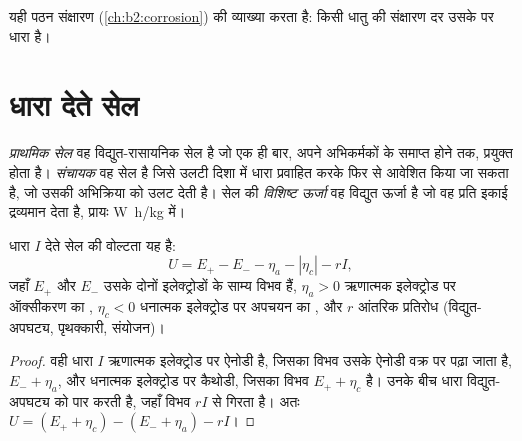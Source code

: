 यही पठन संक्षारण (\cref{ch:b2:corrosion}) की व्याख्या करता है: किसी धातु की संक्षारण
दर उसके  पर धारा है।

\section{धारा देते सेल}

\begin{definition}[बैटरियाँ]\label{def:b2:batteries-electrolysis:battery}
\emph{प्राथमिक सेल} वह विद्युत-रासायनिक सेल है जो
एक ही बार, अपने अभिकर्मकों के समाप्त होने तक, प्रयुक्त होता है। \emph{संचायक}
वह सेल है जिसे उलटी दिशा में धारा प्रवाहित करके फिर से आवेशित किया जा सकता है,
जो उसकी अभिक्रिया को उलट देती है। सेल की \emph{विशिष्ट
ऊर्जा} वह विद्युत ऊर्जा है जो वह प्रति इकाई द्रव्यमान
देता है, प्रायः \unit{W.h/kg} में।
\end{definition}

\begin{proposition}[धारा देते सेल की वोल्टता]\label{prop:b2:batteries-electrolysis:delivering}
धारा $I$ देते सेल की वोल्टता यह है:
\[
  U = E_+ - E_- - \eta_a - |\eta_c| - rI ,
\]
जहाँ $E_+$ और $E_-$ उसके दोनों इलेक्ट्रोडों के साम्य विभव हैं,
$\eta_a > 0$ ऋणात्मक इलेक्ट्रोड पर ऑक्सीकरण का ,
$\eta_c < 0$ धनात्मक इलेक्ट्रोड पर अपचयन का , और $r$
आंतरिक प्रतिरोध (विद्युत-अपघट्य, पृथक्कारी, संयोजन)।
\end{proposition}

\begin{proof}
वही धारा $I$ ऋणात्मक इलेक्ट्रोड पर ऐनोडी है, जिसका विभव
उसके ऐनोडी वक्र पर पढ़ा जाता है, $E_- + \eta_a$, और धनात्मक इलेक्ट्रोड पर कैथोडी,
जिसका विभव $E_+ + \eta_c$ है। उनके बीच धारा विद्युत-अपघट्य को पार करती है,
जहाँ विभव $rI$ से गिरता है। अतः $U = (E_+ + \eta_c) - (E_- +
\eta_a) - rI$।
\end{proof}

